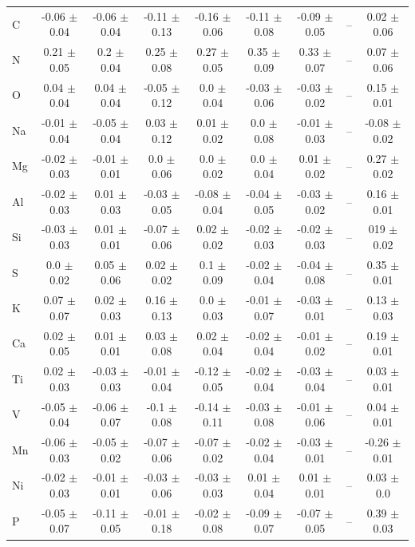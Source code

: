 \documentclass[14pt, preprint2]{aastex6}
\begin{document}
\begin{table}[h]
\begin{tabular}{ | p{} | c| c | c | c | c | c | c | c | }
C & -0.06 $\pm$ 0.04  &-0.06 $\pm$ 0.04 & -0.11 $\pm$ 0.13 & -0.16 $\pm$ 0.06 & -0.11 $\pm$ 0.08 &  -0.09 $\pm$ 0.05 & -- & 0.02 $\pm$ 0.06 \\
N &  0.21 $\pm$ 0.05 & 0.2 $\pm$ 0.04 & 0.25 $\pm$ 0.08  & 0.27 $\pm$ 0.05 & 0.35 $\pm$ 0.09  & 0.33 $\pm$ 0.07  & -- &  0.07 $\pm$ 0.06 \\
O & 0.04 $\pm$ 0.04 &0.04 $\pm$ 0.04 &  -0.05 $\pm$ 0.12  & 0.0 $\pm$ 0.04 & -0.03 $\pm$ 0.06 & -0.03 $\pm$ 0.02 & --  & 0.15 $\pm$ 0.01 \\
Na & -0.01 $\pm$ 0.04 & -0.05 $\pm$ 0.04 & 0.03 $\pm$ 0.12   & 0.01 $\pm$ 0.02  & 0.0 $\pm$ 0.08  & -0.01 $\pm$ 0.03 & --  &  -0.08 $\pm$ 0.02\\
Mg  & -0.02 $\pm$ 0.03 & -0.01 $\pm$ 0.01 & 0.0 $\pm$ 0.06   &0.0 $\pm$ 0.02 & 0.0 $\pm$ 0.04 & 0.01 $\pm$ 0.02 & --  &  0.27 $\pm$ 0.02\\
Al  & -0.02 $\pm$ 0.03 & 0.01 $\pm$ 0.03  & -0.03 $\pm$ 0.05 & -0.08 $\pm$ 0.04 & -0.04 $\pm$ 0.05  & -0.03 $\pm$ 0.02  &  -- &  0.16 $\pm$ 0.01\\
Si & -0.03 $\pm$ 0.03 & 0.01 $\pm$ 0.01 & -0.07 $\pm$ 0.06  & 0.02 $\pm$ 0.02 & -0.02 $\pm$ 0.03 & -0.02 $\pm$ 0.03 &  -- &  019 $\pm$ 0.02\\
S & 0.0 $\pm$ 0.02 &  0.05 $\pm$ 0.06 &  0.02 $\pm$ 0.02 & 0.1 $\pm$ 0.09 & -0.02 $\pm$ 0.04 &-0.04 $\pm$ 0.08  &  -- &  0.35 $\pm$ 0.01\\
K & 0.07 $\pm$ 0.07  &  0.02 $\pm$ 0.03  & 0.16 $\pm$ 0.13 & 0.0 $\pm$ 0.03 &  -0.01 $\pm$ 0.07   &-0.03 $\pm$ 0.01 &  -- &  0.13 $\pm$ 0.03\\
Ca & 0.02 $\pm$ 0.05  &  0.01 $\pm$ 0.01 & 0.03 $\pm$ 0.08  & 0.02 $\pm$ 0.04 & -0.02 $\pm$ 0.04 & -0.01 $\pm$ 0.02 &  -- &  0.19 $\pm$ 0.01\\
Ti & 0.02 $\pm$ 0.03  &  -0.03 $\pm$ 0.03  &  -0.01 $\pm$ 0.04  & -0.12 $\pm$ 0.05 & -0.02 $\pm$ 0.04 & -0.03 $\pm$ 0.04 & --  &  0.03 $\pm$ 0.01\\
V & -0.05 $\pm$ 0.04 &  -0.06 $\pm$ 0.07 &  -0.1 $\pm$ 0.08  & -0.14 $\pm$ 0.11  &  -0.03 $\pm$ 0.08 & -0.01 $\pm$ 0.06  &  -- &  0.04 $\pm$ 0.01\\
Mn & -0.06 $\pm$ 0.03 & -0.05 $\pm$ 0.02  &   -0.07 $\pm$ 0.06 & -0.07 $\pm$ 0.02 & -0.02 $\pm$ 0.04 &-0.03 $\pm$ 0.01 & --  & -0.26 $\pm$ 0.01 \\
Ni & -0.02 $\pm$ 0.03 & -0.01 $\pm$ 0.01 &  -0.03 $\pm$ 0.06 & -0.03 $\pm$ 0.03 & 0.01 $\pm$ 0.04  & 0.01 $\pm$ 0.01 & --  & 0.03 $\pm$ 0.0 \\
P & -0.05 $\pm$ 0.07 &  -0.11 $\pm$ 0.05  &  -0.01 $\pm$ 0.18 & -0.02 $\pm$ 0.08 & -0.09 $\pm$ 0.07 & -0.07 $\pm$ 0.05  &  -- & 0.39 $\pm$ 0.03 \\

\end{tabular}
\end{table}
\end{document}
